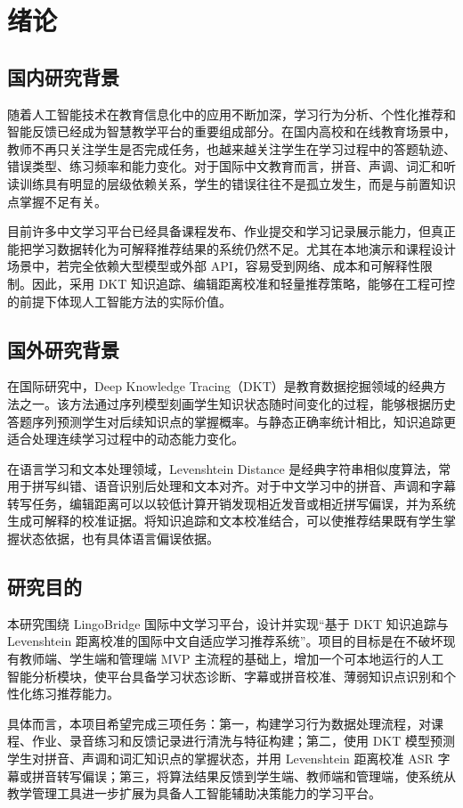
\chapter{绪论}

\section{国内研究背景}

随着人工智能技术在教育信息化中的应用不断加深，学习行为分析、个性化推荐和智能反馈已经成为智慧教学平台的重要组成部分。在国内高校和在线教育场景中，教师不再只关注学生是否完成任务，也越来越关注学生在学习过程中的答题轨迹、错误类型、练习频率和能力变化。对于国际中文教育而言，拼音、声调、词汇和听读训练具有明显的层级依赖关系，学生的错误往往不是孤立发生，而是与前置知识点掌握不足有关。

目前许多中文学习平台已经具备课程发布、作业提交和学习记录展示能力，但真正能把学习数据转化为可解释推荐结果的系统仍然不足。尤其在本地演示和课程设计场景中，若完全依赖大型模型或外部 API，容易受到网络、成本和可解释性限制。因此，采用 DKT 知识追踪、编辑距离校准和轻量推荐策略，能够在工程可控的前提下体现人工智能方法的实际价值。

\section{国外研究背景}

在国际研究中，Deep Knowledge Tracing（DKT）是教育数据挖掘领域的经典方法之一。该方法通过序列模型刻画学生知识状态随时间变化的过程，能够根据历史答题序列预测学生对后续知识点的掌握概率。与静态正确率统计相比，知识追踪更适合处理连续学习过程中的动态能力变化。

在语言学习和文本处理领域，Levenshtein Distance 是经典字符串相似度算法，常用于拼写纠错、语音识别后处理和文本对齐。对于中文学习中的拼音、声调和字幕转写任务，编辑距离可以以较低计算开销发现相近发音或相近拼写偏误，并为系统生成可解释的校准证据。将知识追踪和文本校准结合，可以使推荐结果既有学生掌握状态依据，也有具体语言偏误依据。

\section{研究目的}

本研究围绕 LingoBridge 国际中文学习平台，设计并实现“基于 DKT 知识追踪与 Levenshtein 距离校准的国际中文自适应学习推荐系统”。项目的目标是在不破坏现有教师端、学生端和管理端 MVP 主流程的基础上，增加一个可本地运行的人工智能分析模块，使平台具备学习状态诊断、字幕或拼音校准、薄弱知识点识别和个性化练习推荐能力。

具体而言，本项目希望完成三项任务：第一，构建学习行为数据处理流程，对课程、作业、录音练习和反馈记录进行清洗与特征构建；第二，使用 DKT 模型预测学生对拼音、声调和词汇知识点的掌握状态，并用 Levenshtein 距离校准 ASR 字幕或拼音转写偏误；第三，将算法结果反馈到学生端、教师端和管理端，使系统从教学管理工具进一步扩展为具备人工智能辅助决策能力的学习平台。
